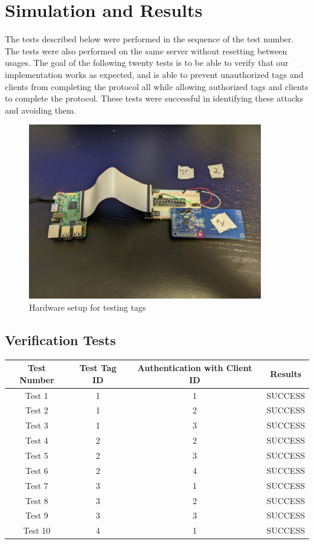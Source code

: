 \section{Simulation and Results}

The tests described below were performed in the sequence of the test number. The tests were also performed on the same server without resetting between usages. The goal of the following twenty tests is to be able to verify that our implementation works as expected, and is able to prevent unauthorized tags and clients from completing the protocol all while allowing authorized tags and clients to complete the protocol. These tests were successful in identifying these attacks and avoiding them.

\begin{figure}[H]
    \centering
    \includegraphics[width=4in]{figures/testing_setup.jpg}
    \caption{Hardware setup for testing tags}
\end{figure}

\subsection{Verification Tests}
\begin{center}
    \begin{tabular}{|c|c|c|c|}
        \hline
        \textbf{Test Number} & \textbf{Test Tag ID} & \textbf{Authentication with Client ID} & \textbf{Results}\\
        \hline
        Test 1 & 1 & 1 & SUCCESS\\
        \hline
        Test 2 & 1 & 2 & SUCCESS\\
        \hline
        Test 3 & 1 & 3 & SUCCESS\\
        \hline
        Test 4 & 2 & 2 & SUCCESS\\
        \hline
        Test 5 & 2 & 3 & SUCCESS\\
        \hline
        Test 6 & 2 & 4 & SUCCESS\\
        \hline
        Test 7 & 3 & 1 & SUCCESS\\
        \hline
        Test 8 & 3 & 2 & SUCCESS\\
        \hline
        Test 9 & 3 & 3 & SUCCESS\\
        \hline
        Test 10 & 4 & 1 & SUCCESS\\
        \hline
    \end{tabular}
\end{center}

